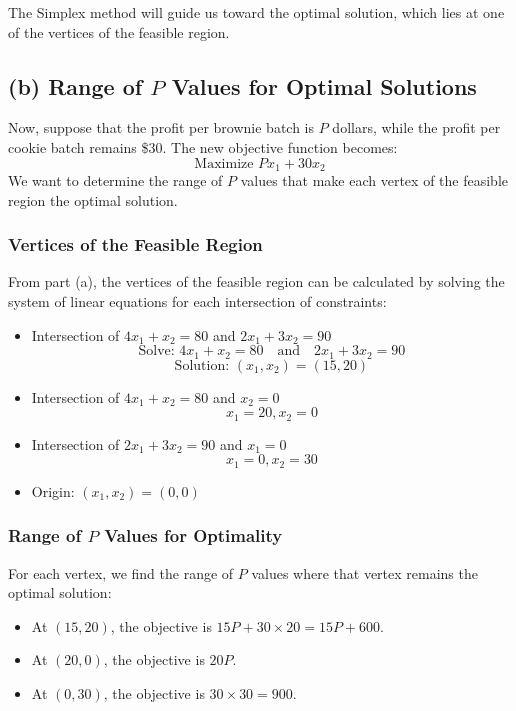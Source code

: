 \documentclass[11pt]{article}
\begin{document}
The Simplex method will guide us toward the optimal solution, which lies at one of the vertices of the feasible region.

\subsection*{(b) Range of \( P \) Values for Optimal Solutions}

Now, suppose that the profit per brownie batch is \( P \) dollars, while the profit per cookie batch remains \$30. The new objective function becomes:
\[
\text{Maximize } P x_1 + 30 x_2
\]
We want to determine the range of \( P \) values that make each vertex of the feasible region the optimal solution.

\subsubsection*{Vertices of the Feasible Region}

From part (a), the vertices of the feasible region can be calculated by solving the system of linear equations for each intersection of constraints:
\begin{itemize}
    \item Intersection of \( 4x_1 + x_2 = 80 \) and \( 2x_1 + 3x_2 = 90 \)
    \[
    \text{Solve: } 4x_1 + x_2 = 80 \quad \text{and} \quad 2x_1 + 3x_2 = 90
    \]
    \[
    \text{Solution: } (x_1, x_2) = (15, 20)
    \]
    \item Intersection of \( 4x_1 + x_2 = 80 \) and \( x_2 = 0 \)
    \[
    x_1 = 20, x_2 = 0
    \]
    \item Intersection of \( 2x_1 + 3x_2 = 90 \) and \( x_1 = 0 \)
    \[
    x_1 = 0, x_2 = 30
    \]
    \item Origin: \( (x_1, x_2) = (0, 0) \)
\end{itemize}

\subsubsection*{Range of \( P \) Values for Optimality}

For each vertex, we find the range of \( P \) values where that vertex remains the optimal solution:
\begin{itemize}
    \item At \( (15, 20) \), the objective is \( 15P + 30 \times 20 = 15P + 600 \).
    \item At \( (20, 0) \), the objective is \( 20P \).
    \item At \( (0, 30) \), the objective is \( 30 \times 30 = 900 \).
\end{itemize}
\end{document}
